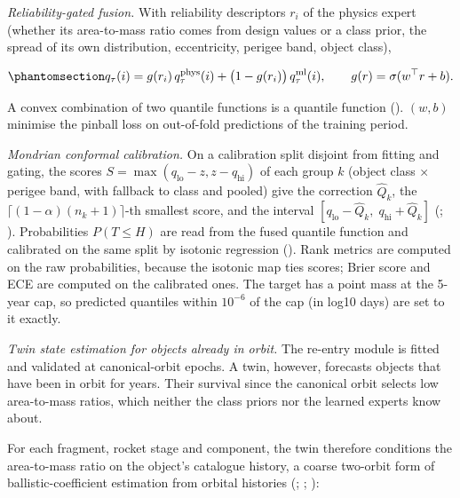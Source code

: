 \documentclass[
]{article}
\begin{document}
\emph{Reliability-gated fusion.} With reliability descriptors \(r_i\) of
the physics expert (whether its area-to-mass ratio comes from design
values or a class prior, the spread of its own distribution,
eccentricity, perigee band, object class),

\begin{equation}\protect\phantomsection\label{eq:gate}{q_\tau(i) = g(r_i)\,q^{\text{phys}}_\tau(i) + \bigl(1-g(r_i)\bigr)\,q^{\text{ml}}_\tau(i), \qquad g(r) = \sigma(w^\top r + b).}\end{equation}

A convex combination of two quantile functions is a quantile function
().
\((w, b)\) minimise the pinball loss on out-of-fold predictions of the
training period.

\emph{Mondrian conformal calibration.} On a calibration split disjoint
from fitting and gating, the scores
\(S = \max(q_{\text{lo}} - z, z - q_{\text{hi}})\) of each group \(k\)
(object class × perigee band, with fallback to class and pooled) give
the correction \(\hat Q_k\), the \(\lceil(1-\alpha)(n_k+1)\rceil\)-th
smallest score, and the interval
\([q_{\text{lo}} - \hat Q_k,\; q_{\text{hi}} + \hat Q_k]\)
(;
). Probabilities
\(P(T \le H)\) are read from the fused quantile function and calibrated
on the same split by isotonic regression
().
Rank metrics are computed on the raw probabilities, because the isotonic
map ties scores; Brier score and ECE are computed on the calibrated
ones. The target has a point mass at the 5-year cap, so predicted
quantiles within \(10^{-6}\) of the cap (in log10 days) are set to it
exactly.

\emph{Twin state estimation for objects already in orbit.} The re-entry
module is fitted and validated at canonical-orbit epochs. A twin,
however, forecasts objects that have been in orbit for years. Their
survival since the canonical orbit selects low area-to-mass ratios,
which neither the class priors nor the learned experts know about.

For each fragment, rocket stage and component, the twin therefore
conditions the area-to-mass ratio on the object's catalogue history, a
coarse two-orbit form of ballistic-coefficient estimation from orbital
histories (; ;
):
\end{document}
